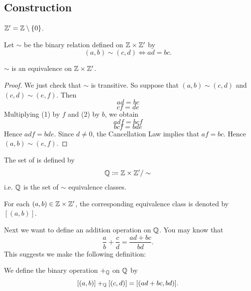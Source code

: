 \subsection{Construction}
\begin{notation}
$\mathbb Z^\prime=\mathbb Z\setminus\{0\}$.
\end{notation}

\begin{definition}
Let $\sim$ be the binary relation defined on $\mathbb Z\times\mathbb Z^\prime$ by
\[ (a,b)\sim(c,d) \iff ad=bc. \]
\end{definition}

\begin{proposition}
$\sim$ is an equivalence on $\mathbb Z\times\mathbb Z^\prime$.
\end{proposition}

\begin{proof}
We just check that $\sim$ is transitive. So suppose that $(a,b)\sim(c,d)$ and $(c,d)\sim(e,f)$. Then
\begin{equation*}\tag{1}
ad=bc
\end{equation*}
\begin{equation*}\tag{2}
cf=de
\end{equation*}
Multiplying (1) by $f$ and (2) by $b$, we obtain
\begin{equation*}\tag{3}
adf=bcf
\end{equation*}
\begin{equation*}\tag{4}
bcf=bde
\end{equation*}
Hence $adf=bde$. Since $d\neq0$, the Cancellation Law implies that $af=bc$. Hence $(a,b)\sim(e,f)$.
\end{proof}

\begin{definition}
The set of  is defined by
\[ \mathbb Q\coloneqq\mathbb Z\times\mathbb Z^\prime/\sim \]
i.e. $\mathbb Q$ is the set of $\sim$ equivalence classes.
\end{definition}

\begin{notation}
For each $(a,b)\in\mathbb Z\times\mathbb Z^\prime$, the corresponding equivalence class is denoted by $[(a,b)]$.
\end{notation}

Next we want to define an addition operation on $\mathbb Q$. You may know that
\[\frac{a}{b}+\frac{c}{d}=\frac{ad+bc}{bd}.\]
This suggests we make the following definition:

\begin{definition}
We define the binary operation $+_\mathbb Q$ on $\mathbb Q$ 
by
\[[(a,b)]+_\mathbb Q[(c,d)]=[(ad+bc,bd)].\]
\end{definition}

